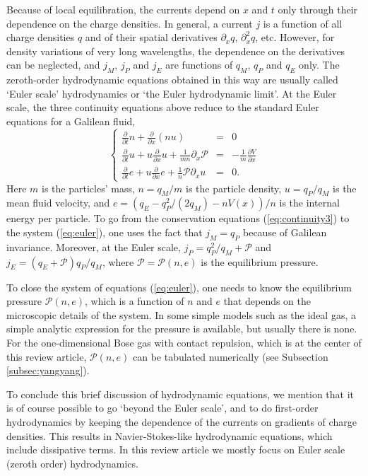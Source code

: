 \documentclass[onecolumn,amsfonts,showpacs,superscriptaddress]{revtex4-1}
\begin{document}
Because of local equilibration, the currents depend on $x$ and $t$ only through their dependence on the charge densities. In general, a current $j$ is a function of all charge densities $q$ and of their spatial derivatives $\partial_x q$, $\partial_x^2 q$, etc. However, for density variations of very long wavelengths, the dependence on the derivatives can be neglected, and 
$j_M$, $j_P$ and $j_E$ are functions of $q_M$, $q_P$ and $q_E$ only. The zeroth-order hydrodynamic equations obtained in this way are usually called `Euler scale' hydrodynamics or `the Euler hydrodynamic limit'. At the Euler scale, the three continuity equations above reduce to the standard Euler equations for a Galilean fluid,
\begin{equation}
	\label{eq:euler}
	\left\{  \begin{array}{ccc}
		\frac{\partial}{\partial t} n + \frac{\partial}{\partial x}  (nu) &=& 0 \\ 
		\frac{\partial}{\partial t} u + u \frac{\partial}{\partial x} u + \frac{1}{m n} \partial_x \mathcal{P} &=& - \frac{1}{m} \frac{\partial V}{\partial x}   \\ 
		\frac{\partial}{\partial t}  e + u \frac{\partial}{\partial x}  e + \frac{1}{n} \mathcal{P} \partial_x u  &=& 0  .
	\end{array} \right.
\end{equation}
Here $m$ is the particles' mass, $n = q_M/m$ is the particle density, $u = q_P/q_M$ is the mean fluid velocity, and $e = (q_E - q_P^2/(2 q_M) - n V(x) ) /n$ is the internal energy per particle. To go from the conservation equations (\ref{eq:continuity3}) to the system (\ref{eq:euler}), one uses the fact that $j_M = q_P$ because of Galilean invariance. Moreover, at the Euler scale, $j_P = q_P^2/q_M + \mathcal{P}$ and $j_E =  (q_E + \mathcal{P}) q_P/q_M$, where $\mathcal{P} = \mathcal{P}(n,e)$ is the equilibrium pressure.

To close the system of equations (\ref{eq:euler}), one needs to know the equilibrium pressure $\mathcal{P}(n,e)$, which is a function of $n$ and $e$ that depends on the microscopic details of the system. In some simple models such as the ideal gas, a simple analytic expression for the pressure is available, but usually there is none. For the one-dimensional Bose gas with contact repulsion, which is at the center of this review article, $\mathcal{P}(n,e)$ can be tabulated numerically (see Subsection \ref{subsec:yangyang}).

To conclude this brief discussion of hydrodynamic equations, we mention that it is of course possible to go `beyond the Euler scale', and to do first-order hydrodynamics by keeping the dependence of the currents on gradients of charge densities. This results in Navier-Stokes-like hydrodynamic equations, which include dissipative terms. In this review article we mostly focus on Euler scale (zeroth order) hydrodynamics.
\end{document}
